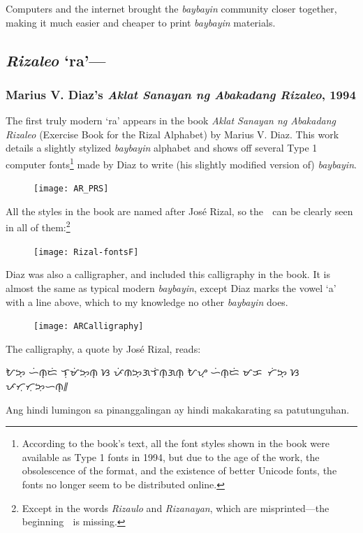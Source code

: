 \documentclass[a4paper,pagesize,openany,14pt,parskip=never]{scrbook}
\newcommand{\≈}{$\approx$}
\begin{document}
Computers and the internet brought the {\em baybayin} community closer together, making it much easier and cheaper to print {\em baybayin} materials. 

\subsection{{\em Rizaleo} `ra'---{\baybayinb {}}}
\subsubsection{Marius V. Diaz's {\em Aklat Sanayan ng Abakadang Rizaleo}, 1994}
The first truly modern `ra' appears in the book {\em Aklat Sanayan ng Abakadang Rizaleo} (Exercise Book for the Rizal Alphabet) by Marius V. Diaz. This work details a slightly stylized {\em baybayin} alphabet and shows off several Type 1 computer fonts\footnote{According to the book's text, all the font styles shown in the book were available as Type 1 fonts in 1994, but due to the age of the work, the obsolescence of the format, and the existence of better Unicode fonts, the fonts no longer seem to be distributed online.} made by Diaz to write (his slightly modified version of) {\em baybayin}.

\begin{figure}[h]
\texttt{[image: AR\_PRS]}
\end{figure}

\newpage
All the styles in the book are named after Jos\'e Rizal, so the {\baybayin ᜍ} can be clearly seen in all of them:\footnote{Except in the words {\em Rizaulo} and {\em Rizanayan}, which are misprinted---the beginning {\baybayin ᜍᜒ} is missing.}

\begin{figure}[H]
\texttt{[image: Rizal-fontsF]}
\end{figure}
\newpage
\label{RizaleoC}
Diaz was also a calligrapher, and included this calligraphy in the book. It is almost the same as typical modern {\em baybayin}, except Diaz marks the vowel `a' with a line above, which to my knowledge no other {\em baybayin} does.

\begin{figure}[H]
\texttt{[image: ARCalligraphy]}
\end{figure}
The calligraphy, a quote by Jos\'e Rizal, reads:

    {\baybayin ᜀᜅ᜔ ᜑᜒᜈ᜔ᜇᜒ ᜎᜓᜋᜒᜅᜓᜈ᜔ ᜐ ᜉᜒᜈᜅ᜔ᜄᜎᜒᜈ᜔ᜄᜈ᜔ ᜀᜌ᜔ ᜑᜒᜈ᜔ᜇᜒ ᜋᜃᜍᜍᜆᜒᜅ᜔ ᜐ ᜉᜆᜓᜆᜓᜅᜓᜑᜈ᜔᜶}

    Ang hindi lumingon sa pinanggalingan ay hindi makakarating sa patutunguhan.
\end{document}
